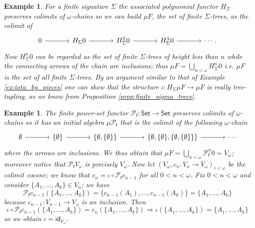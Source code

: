 \documentclass[letterpaper, 11pt, oneside]{memoir}
\theoremstyle{myteo}
\newtheorem{example}[theorem]{Example}
\numberwithin{equation}{section}
\newcommand{\id}{\textsf{id}}
\newcommand{\Set}{\textsf{Set}}
\begin{document}
\begin{example}
  For a finite signature \(\Sigma\) the associated polynomial functor \(H_\Sigma\) preserves colimits of \(\omega\)-chains so we can build \(\mu F\), the set of finite \(\Sigma\)-trees, as the colimit of
  \begin{equation*}
    \begin{tikzcd}[sep = large]
      0 \ar[r] & H_\Sigma0 \ar[r] & H_\Sigma^20 \ar[r] & H_\Sigma^30 \ar[r] & \cdots .
    \end{tikzcd}
  \end{equation*}
  Now \(H^n_\Sigma0\) can be regarded as the set of finite \(\Sigma\)-trees of height less than \(n\) while the connecting arrows of the chain are inclusions; thus \(\mu F = \bigcup_{n < \omega}H^n_\Sigma0\) i.e. \(\mu F\) is the set of all finite \(\Sigma\)-trees.
  By an argument similar to that of Example \ref{ex:iota_by_pieces} one can show that the structure \(\iota : H_\Sigma\mu F
  \to \mu F\) is really tree-tupling, as we know from Proposition \ref{prop:finite_sigma_trees}.
\end{example}

\begin{example}
  \label{ex:finite_powerset_adamek}
  The finite power-set functor \(\mathcal{P}_\textsf{f} \colon \Set \to \Set\) preserves colimits of \(\omega\)-chains so it has an initial algebra \(\mu \mathcal{P}_\textsf{f}\) that is the colimit of the following \(\omega\)-chain
  \begin{equation*}
    \begin{tikzcd}[sep = large]
      \emptyset \ar[r] & \{\emptyset\} \ar[r] & \{\emptyset, \{\emptyset\}\} \ar[r] & \{\emptyset, \{\emptyset\}, \{\emptyset, \{\emptyset\}\}\} \ar[r] & \cdots
    \end{tikzcd}
  \end{equation*}
  where the arrows are inclusions.
  We thus obtain that \(\mu F = \bigcup_{n<\omega} \mathcal{P}_\textsf{f}^n0 = V_\omega\); moreover notice that \(\mathcal{P}_\textsf{f}V_\omega\) is precisely \(V_\omega\).
  Now let \((V_\omega, c_n : V_n \to V_\omega)_{i < \omega}\) be the colimit cocone; we know that \(c_n = \iota \circ \mathcal{P}_\textsf{f}c_{n-1}\) for all \(0 < n < \omega\).
  Fix \(0 < n < \omega\) and consider \(\{A_1, \ldots, A_k\} \in V_n\); we have
  \begin{equation*}
    \mathcal{P}_\textsf{f}c_{n-1}(\{A_1, \ldots, A_k\}) = \{c_{n-1}(A_1), \ldots, c_{n-1}(A_k)\} = \{A_1, \ldots, A_k\}
  \end{equation*}
  because \(c_{n - 1}: V_{n-1} \to V_\omega\) is an inclusion.
  Then
  \begin{equation*}
    \iota \circ \mathcal{P}_\textsf{f}c_{n-1}(\{A_1, \ldots, A_k\}) = c_n(\{A_1, \ldots, A_k\}) \Rightarrow \iota(\{A_1, \ldots, A_k\}) = \{A_1, \ldots, A_k\}
  \end{equation*}
  so we obtain \(\iota = \id_{V_\omega}\).
\end{example}
\end{document}

